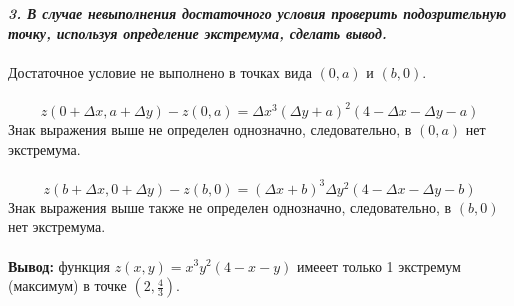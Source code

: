 \documentclass[a5paper, 10pt]{article}
\theoremstyle{definition}
\theoremstyle{plain}
\theoremstyle{remark}
\begin{document}
\textit{\textbf{3. В случае невыполнения достаточного условия проверить подозрительную точку, используя определение экстремума, сделать вывод.}}\\
\\
Достаточное условие не выполнено в точках вида  $ \left(0, a \right)$ и $ \left(b, 0 \right)$.\\
\\
\begin{equation}
z\left(0 + \Delta x, a + \Delta y\right) - z \left(0, a \right) =  \Delta x^3\left(\Delta y + a \right)^2(4-\Delta x- \Delta y - a) 
\end{equation}
Знак выражения выше не определен однозначно, следовательно, в $ \left(0, a \right)$ нет экстремума.
\\
\\
\begin{equation}
z\left(b + \Delta x, 0 + \Delta y\right) - z \left(b, 0 \right) =  \left(\Delta x + b \right)^3\Delta y^2(4-\Delta x- \Delta y - b) 
\end{equation}
Знак выражения выше также не определен однозначно, следовательно, в $ \left(b, 0 \right)$ нет экстремума.\\
\\
\textbf{Вывод:} функция $z(x,y) = x^3y^2(4-x-y)$ имееет только 1 экстремум (максимум) в точке $  \left(2, \frac{4}{3}\right)$.
\\
\\
\end{document}
